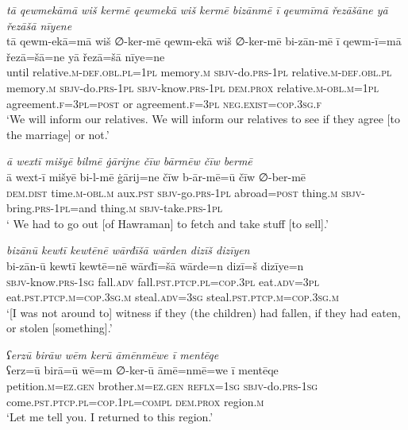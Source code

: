 \ea \label{ŽE.83}
\textit{tā qewmekāmā wiš kermē qewmekā wiš kermē bizānmē ī qewmīmā řezāšāne yā řezāšā nīyene} \\ 
\gll tā qewm-ekā=mā wiš ∅-ker-mē qewm-ekā wiš ∅-ker-mē bi-zān-mē ī qewm-ī=mā řezā=šā=ne yā řezā=šā nīye=ne \\ 
 until relative\textsc{.m}\textsc{-def}\textsc{.obl}\textsc{.pl}\textsc{=1pl} memory\textsc{.m} \textsc{sbjv-}do\textsc{.prs}\textsc{-1pl} relative\textsc{.m}\textsc{-def}\textsc{.obl}\textsc{.pl} memory\textsc{.m} \textsc{sbjv-}do\textsc{.prs}\textsc{-1pl} \textsc{sbjv-}know\textsc{.prs}\textsc{-1pl} \textsc{dem.prox} relative\textsc{.m}\textsc{-obl}\textsc{.m}\textsc{=1pl} agreement\textsc{.f}\textsc{=3pl}\textsc{=\textsc{post}} or agreement\textsc{.f}\textsc{=3pl} \textsc{\textsc{neg.}exist}\textsc{=cop}\textsc{.3sg}\textsc{.f} \\ 
\glt `We will inform our relatives. We will inform our relatives to see if they agree [to the  marriage] or not.'
\z 
 
\ea \label{ŽM.22}
\textit{ā wextī mišyē bilmē ġārijne čīw bārmēw čīw bermē} \\ 
\gll ā wext-ī mišyē bi-l-mē ġārij=ne čīw b-ār-mē=ū čīw ∅-ber-mē \\ 
 \textsc{dem.dist} time\textsc{.m}\textsc{-obl}\textsc{.m} aux\textsc{.pst} \textsc{sbjv-}go\textsc{.prs}\textsc{-\textsc{1pl}} abroad\textsc{=\textsc{post}} thing\textsc{.m} \textsc{sbjv-}bring\textsc{.prs}\textsc{-\textsc{1pl}}=and thing\textsc{.m} \textsc{sbjv-}take\textsc{.prs}\textsc{-\textsc{1pl}} \\ 
\glt ` We had to go out [of Hawraman] to fetch and take stuff [to sell].'
\z 
 
\ea \label{ŽM.29}
\textit{bizānū kewtī kewtēnē wārđīšā wārden dizīš dizīyen} \\ 
\gll bi-zān-ū kewtī kewtē=nē wārđī=šā wārde=n dizī=š dizīye=n \\ 
 \textsc{sbjv-}know\textsc{.prs}\textsc{-\textsc{1sg}} fall\textsc{.adv} fall\textsc{.pst}\textsc{.ptcp}\textsc{.pl}\textsc{=cop}\textsc{.3pl} eat\textsc{.adv}\textsc{=3pl} eat\textsc{.pst}\textsc{.ptcp}\textsc{.m}\textsc{=cop}\textsc{.3sg}\textsc{.m} steal\textsc{.adv}\textsc{=3sg} steal\textsc{.pst}\textsc{.ptcp}\textsc{.m}\textsc{=cop}\textsc{.3sg}\textsc{.m} \\ 
\glt `[I was not around to] witness if they (the children) had fallen, if they had eaten, or stolen [something].'
\z 
 
\ea \label{ŽM.53}
\textit{ʕerzū birāw wēm kerū āmēnmēwe ī mentēqe} \\ 
\gll ʕerz=ū birā=ū wē=m ∅-ker-ū āmē=nmē=we ī mentēqe \\ 
 petition\textsc{.m}\textsc{=ez.gen} brother\textsc{.m}\textsc{=ez.gen} \textsc{reflx}\textsc{=\textsc{1sg}} \textsc{sbjv-}do\textsc{.prs}\textsc{-\textsc{1sg}} come\textsc{.pst}\textsc{.ptcp}\textsc{.pl}\textsc{=cop}\textsc{.\textsc{1pl}}\textsc{=compl} \textsc{dem.prox} region\textsc{.m} \\ 
\glt `Let me tell you. I returned to this region.'
\z 
 
